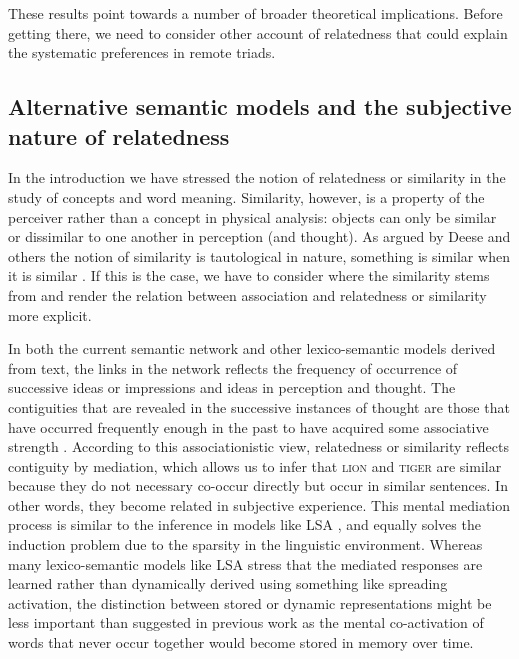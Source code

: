 \documentclass[doc]{apa6}
\newcommand{\stimulus}[1]{\textsc{#1}}
\begin{document}
These results point towards a number of broader theoretical implications. Before getting there, we need to consider other account of relatedness that could explain the systematic preferences in remote triads.

\bigskip

\subsection{Alternative semantic models and the subjective nature of relatedness}



In the introduction we have stressed the notion of relatedness or similarity in the study of concepts and word meaning. Similarity, however, is a property of the perceiver rather than a concept in physical analysis: objects can only be similar or dissimilar to one another in perception (and thought). As argued by Deese and others the notion of similarity is tautological in nature, something is similar when it is similar \parencite[see p 12,][]{Deese1965}. If this is the case, we have to consider where the similarity stems from and render the relation between association and relatedness or similarity more explicit.

In both the current semantic network and other lexico-semantic models derived from text, the links in the network reflects the frequency of occurrence of successive ideas or impressions and ideas in perception and thought. The contiguities that are revealed in the successive instances of thought are those that have occurred frequently enough in the past to have acquired some associative strength \parencite{Deese1965}. According to this associationistic view, relatedness or similarity reflects contiguity by mediation, which allows us to infer that \stimulus{lion} and \stimulus{tiger} are similar because they do not necessary co-occur directly but occur in similar sentences. In other words, they become related in subjective experience. This mental mediation process is similar to the inference in models like LSA \parencite{Landauer1997}, and equally solves the induction problem due to the sparsity in the linguistic environment.
Whereas many lexico-semantic models like LSA stress that the mediated responses are learned rather than dynamically derived using something like spreading activation, the distinction between stored or dynamic representations might be less important than suggested in previous work \parencite{Ratcliff1994,Hare2009} as the mental co-activation of words that never occur together would become stored in memory over time.
\end{document}
